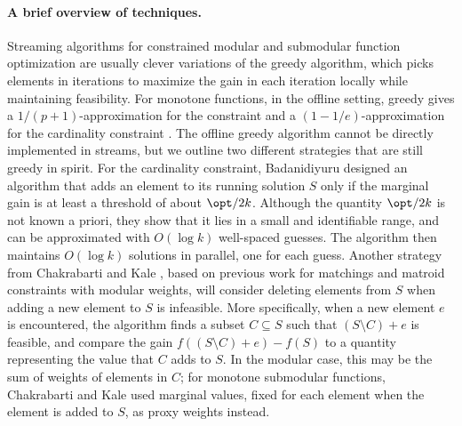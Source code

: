 \documentclass[oneside,letterpaper]{scrartcl} \usepackage{macros}
\begin{document}
\paragraph{A brief overview of techniques.} Streaming algorithms for constrained modular and submodular function
optimization are usually clever variations of the greedy algorithm,
which picks elements in iterations to maximize the gain in each
iteration locally while maintaining feasibility.  For monotone
functions, in the offline setting, greedy gives a
$1/(p+1)$-approximation for the  constraint and
a $(1-1/e)$-approximation for the cardinality constraint
\cite{fnw-mssf2-78}. The offline greedy algorithm cannot be directly
implemented in streams, but we outline two different strategies that
are still greedy in spirit. For the cardinality constraint, Badanidiyuru \etal \cite{bmkk-sso-14}
designed an algorithm that adds an element to its running solution $S$
only if the marginal gain is at least a threshold of about
$\opt/2k$. Although the quantity $\opt/2k$ is not known a priori, they
show that it lies in a small and identifiable range, and can be
approximated with $O(\log k)$ well-spaced guesses. The algorithm then
maintains $O(\log k)$ solutions in parallel, one for each
guess. Another strategy from Chakrabarti and Kale \cite{ck-smms-14},
based on previous work for matchings \cite{fkmsz-gpssm-05,m-fgmds-05}
and matroid constraints \cite{abv-11} with modular weights, will
consider deleting elements from $S$ when adding a new element to $S$
is infeasible. More specifically, when a new element $e$ is
encountered, the algorithm finds a subset $C \subseteq S$ such that
$(S \setminus C) + e$ is feasible, and compare the gain $f((S
\setminus C) + e) - f(S)$ to a quantity representing the value that
$C$ adds to $S$. In the modular case, this may be the sum of weights
of elements in $C$; for monotone submodular functions, Chakrabarti and
Kale used marginal values, fixed for each element when the element is
added to $S$, as proxy weights instead.
\end{document}
